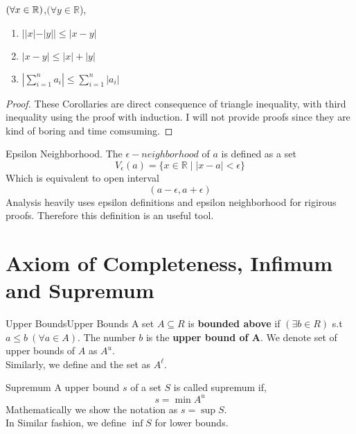 \begin{corollary}
    $(\forall x \in {\mathbb{R}})$,$(\forall y \in \mathbb{R}$),
    \begin{enumerate}
        \item $ ||x| - |y|| \le |x-y|$
        \item $|x-y| \le |x| + |y|$
        \item $ \left| \sum_{i=1}^n a_i \right| \le  \sum_{i=1}^n |a_i|$
    \end{enumerate}
    \begin{proof}
        These Corollaries are direct consequence of triangle inequality,
        with third inequality using the proof with induction. I will not
        provide proofs since they are kind of boring and time comsuming.
    \end{proof}
\end{corollary}

\begin{defi}{Epsilon Neighborhood}.
    The $\epsilon-neighborhood$ of
    $a$ is defined as a set
    \[ V_{\epsilon}(a) = \{ x \in \mathbb{R} \mid |x-a| < \epsilon\}\]
    Which is equivalent to open interval
    \[ (a - \epsilon, a+ \epsilon)\]
    Analysis heavily uses epsilon definitions and epsilon neighborhood
    for rigirous proofs. Therefore this definition is an useful tool.
\end{defi}

\section{Axiom of Completeness, Infimum and Supremum}

\begin{defi}{Upper Bounds}{Upper Bounds}
    A set $A \subseteq R$ is \textbf{bounded above} if $(\exists b \in
    R)$ s.t $ a \le b \ (\forall a \in A)$. The number $b$ is the
    \textbf{upper bound of  A}. We denote set of upper bounds of $A$
    as $A^u$. \\
    Similarly, we define  and the set as $A^{\ell}$.
\end{defi}

\begin{defi}{Supremum}
    A upper bound $s$ of a set $S$
    is called supremum if,
    \[ s = \min A^{u}\]
    Mathematically we show the notation as $s = \sup S$.\\
    In Similar fashion, we define $\inf S$ for lower bounds.
\end{defi}
\vspace{6mm}

